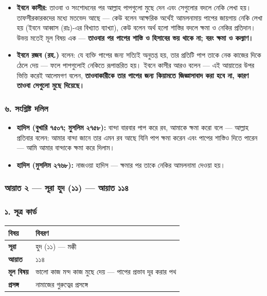 \begin{itemize}
\item \textbf{ইবনে কাসীর:} তাওবা ও সংশোধনের পর আল্লাহ পাপগুলো মুছে দেন এবং সেগুলোর বদলে নেকি লেখা হয়। তাফসীরকারকদের মধ্যে মতভেদ আছে — কেউ বলেন আক্ষরিক অর্থেই আমলনামায় পাপের জায়গায় নেকি লেখা হয় (ইবনে আব্বাস (রাঃ)-এর বিখ্যাত ব্যাখ্যা), কেউ বলেন অর্থ হলো শাস্তির বদলে ক্ষমা ও নেকির প্রতিদান। উভয় মতেই মূল বিষয় এক — \textbf{তাওবার পর পাপের শাস্তি ও হিসাবের ভয় থাকে না; বরং ক্ষমা ও কল্যাণ।}
\item \textbf{ইবনে রজব (রহ.)} বলেন: যে ব্যক্তি পাপের জন্য সত্যিই অনুতপ্ত হয়, তার প্রতিটি পাপ তাকে নেক কাজের দিকে ঠেলে দেয় — ফলে পাপগুলোই নেকিতে রূপান্তরিত হয়। ইবনে কাসীর আরও বলেন — এই আয়াতের উপর ভিত্তি করেই আলেমগণ বলেন, \textbf{তাওবাকারীকে তার পাপের জন্য কিয়ামতে জিজ্ঞাসাবাদ করা হবে না, কারণ তাওবা সেগুলো মুছে দিয়েছে।}
\end{itemize}
\subsubsection*{৬. সংশ্লিষ্ট দলিল}

\begin{itemize}
\item \textbf{হাদিস (বুখারি ৭৫০৭; মুসলিম ২৭৫৮):} বান্দা বারবার পাপ করে রব, আমাকে ক্ষমা করো বলে — আল্লাহ প্রতিবার বলেন: আমার বান্দা জানে তার এমন রব আছে যিনি পাপ ক্ষমা করেন এবং পাপের শাস্তিও দিতে পারেন — আমি আমার বান্দাকে ক্ষমা করে দিলাম।
\item \textbf{হাদিস (মুসলিম ২৭৬৮):} নাজওয়া হাদিস — ক্ষমার পর তাকে নেকির আমলনামা দেওয়া হয়।
\end{itemize}
\subsubsection*{আয়াত ২ — সূরা হুদ (১১) — আয়াত ১১৪}

\subsubsection*{১. সূত্র কার্ড}

\begin{table}[h]\centering\small
\begin{tabular}{ll}
বিষয় & বিবরণ \\
\hline
\textbf{সূরা} & হুদ (১১) — মক্কী \\
\textbf{আয়াত} & ১১৪ \\
\textbf{মূল বিষয়} & ভালো কাজ মন্দ কাজ মুছে দেয় — পাপের প্রভাব দূর করার পথ \\
\textbf{প্রসঙ্গ} & নামাজের গুরুত্বের প্রসঙ্গে \\
\hline
\end{tabular}
\end{table}

